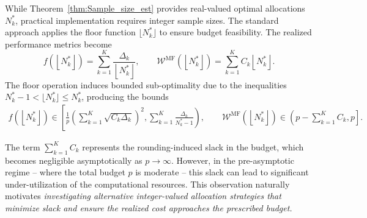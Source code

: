 While Theorem~\ref{thm:Sample_size_est} provides real-valued optimal allocations $N_k^*$, practical implementation requires integer sample sizes. The standard approach \cite{PeWiGu:2016} applies the floor function $\lfloor N_k^* \rfloor$ to ensure budget feasibility. The realized performance metrics become
%
\[
f\left(\left\lfloor N_k^* \right\rfloor\right) = \sum_{k=1}^K\frac{\Delta_{k}}{\left\lfloor N_k^* \right\rfloor}, \qquad \mathcal{W}^{\text{MF}}\left(\left\lfloor N_k^* \right\rfloor\right) = \sum_{k=1}^K C_k\left\lfloor N_k^* \right\rfloor.
\]
%
The floor operation induces bounded sub-optimality due to the inequalities $N_k^*-1 < \lfloor N_k^*\rfloor \le N_k^*$, producing the bounds
%
\begin{equation}\label{eq:bounds_for_floor}
\begin{aligned}
    f\left(\left\lfloor N_k^* \right\rfloor\right) \in \left[\frac{1}{p}\left(\sum_{k=1}^K \sqrt{C_k\Delta_k}\right)^2, \sum_{k=1}^K\frac{\Delta_{k}}{N_k^*-1}\right), \qquad
\mathcal{W}^{\text{MF}}\left(\left\lfloor N_k^* \right\rfloor\right)\in \left( p-\sum_{k=1}^K C_k, p\right].
\end{aligned}
\end{equation}
%

The term $\sum_{k=1}^K C_k$ represents the rounding-induced slack in the budget, which becomes negligible asymptotically as $p \to \infty$. However, in the pre-asymptotic regime -- where the total budget $p$ is moderate -- this  slack can lead to significant under-utilization of the computational resources. This observation naturally motivates \textit{investigating alternative integer-valued allocation strategies that minimize slack and ensure the realized cost approaches the prescribed budget.}


